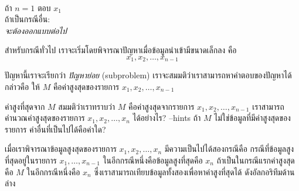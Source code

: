 \begin{algt}
\\
\hspace*{0.2in} ถ้า $n=1$ ตอบ $x_1$\\
\hspace*{0.2in} ถ้า{\wbr}เป็น{\wbr}กรณี{\wbr}อื่น:\\
\hspace*{0.2in}\hspace*{0.2in} {\em จะ{\wbr}ต้อง{\wbr}ออกแบบ{\wbr}ต่อไป}
\end{algt}

สำหรับ{\wbr}กรณี{\wbr}ทั่วไป เรา{\wbr}จะ{\wbr}เริ่ม{\wbr}โดย{\wbr}พิจารณา{\wbr}ปัญหา{\wbr}เมื่อ{\wbr}ข้อมูล{\wbr}นำเข้า{\wbr}มี{\wbr}ขนาด{\wbr}เล็ก{\wbr}ลง คือ{\wbr}
\[
x_1,x_2,\ldots,x_{n-1}
\]


ปัญหา{\wbr}นี้{\wbr}เรา{\wbr}จะ{\wbr}เรียก{\wbr}ว่า {\em ปัญหา{\wbr}ย่อย} (subproblem)
เรา{\wbr}จะ{\wbr}สมมติ{\wbr}ว่า{\wbr}เรา{\wbr}สามารถ{\wbr}หา{\wbr}คำตอบ{\wbr}ของ{\wbr}ปัญหา{\wbr}ได้ กล่าวคือ{\wbr}
ให้ $M$ คือ{\wbr}ค่าสูงสุด{\wbr}ของ{\wbr}รายการ $x_1,x_2,\ldots,x_{n-1}$

\begin{quiz}{ค่า{\wbr}สูง{\wbr}ที่สุด{\wbr}จาก $M$}
สมมติ{\wbr}ว่า{\wbr}เรา{\wbr}ทราบ{\wbr}ว่า $M$ คือ{\wbr}ค่าสูงสุด{\wbr}จาก{\wbr}รายการ 
$x_1,x_2,\ldots,x_{n-1}$
เรา{\wbr}สามารถ{\wbr}คำนวณ{\wbr}ค่าสูงสุด{\wbr}ของ{\wbr}รายการ 
$x_1,x_2,\ldots,x_n$ ได้{\wbr}อย่างไร?
--hints ถ้า $M$ ไม่{\wbr}ใช่{\wbr}ข้อมูล{\wbr}ที่{\wbr}มี{\wbr}ค่าสูงสุด{\wbr}ของ{\wbr}รายการ ค่า{\wbr}อื่น{\wbr}ที่{\wbr}เป็น{\wbr}ไป{\wbr}ได้{\wbr}คือ{\wbr}ค่า{\wbr}ใด?
\end{quiz}


เมื่อ{\wbr}เรา{\wbr}พิจารณา{\wbr}ข้อมูล{\wbr}สูงสุด{\wbr}ของ{\wbr}รายการ $x_1,x_2,\ldots,x_n$
มี{\wbr}ความ{\wbr}เป็น{\wbr}ไป{\wbr}ได้{\wbr}สอง{\wbr}กรณี{\wbr}คือ กรณี{\wbr}ที่{\wbr}ข้อมูล{\wbr}สูง{\wbr}ที่สุด{\wbr}อยู่{\wbr}ใน{\wbr}รายการ $x_1,\ldots,x_{n-1}$
ใน{\wbr}อีก{\wbr}กรณี{\wbr}หนึ่ง{\wbr}คือ{\wbr}ข้อมูล{\wbr}สูง{\wbr}ที่สุด{\wbr}คือ $x_n$ ถ้า{\wbr}เป็น{\wbr}ใน{\wbr}กรณี{\wbr}แรก{\wbr}ค่าสูงสุด{\wbr}คือ $M$ ใน{\wbr}อีก{\wbr}กรณี{\wbr}หนึ่ง{\wbr}คือ{\wbr}
$x_n$ ซึ่ง{\wbr}เรา{\wbr}สามารถ{\wbr}เทียบ{\wbr}ข้อมูล{\wbr}ทั้ง{\wbr}สอง{\wbr}เพื่อ{\wbr}หา{\wbr}ค่า{\wbr}สูง{\wbr}ที่สุด{\wbr}ได้ ดัง{\wbr}อัล{\wbr}กอ{\wbr}ริ{\wbr}ทึม{\wbr}ด้าน{\wbr}ล่าง{\wbr}

